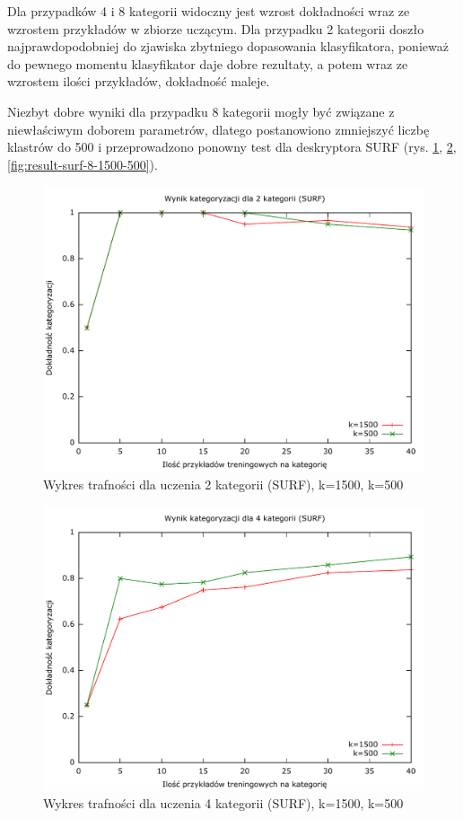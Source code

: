 Dla przypadków 4 i 8 kategorii widoczny jest wzrost dokładności wraz ze wzrostem przykładów w zbiorze uczącym. Dla przypadku 2 kategorii doszło najprawdopodobniej do zjawiska zbytniego dopasowania klasyfikatora, ponieważ do pewnego momentu klasyfikator daje dobre rezultaty, a potem wraz ze wzrostem ilości przykładów, dokładność maleje.

Niezbyt dobre wyniki dla przypadku 8 kategorii mogły być związane z niewłaściwym doborem parametrów, dlatego postanowiono zmniejszyć liczbę klastrów do 500 i przeprowadzono ponowny test dla deskryptora SURF (rys. \ref{fig:result-surf-2-1500-500}, \ref{fig:result-surf-4-1500-500}, \ref{fig:result-surf-8-1500-500}).

\begin{figure}[h]
	\centering
	\includegraphics[scale=0.8]{graphics/04_interpretacja_wynikow/result-surf-2-1500-500.pdf}
	\caption{ Wykres trafności dla uczenia 2 kategorii (SURF), k=1500, k=500 }
	\label{fig:result-surf-2-1500-500}
\end{figure}

\begin{figure}[h]
	\centering
	\includegraphics[scale=0.8]{graphics/04_interpretacja_wynikow/result-surf-4-1500-500.pdf}
	\caption{ Wykres trafności dla uczenia 4 kategorii (SURF), k=1500, k=500 }
	\label{fig:result-surf-4-1500-500}
\end{figure}

